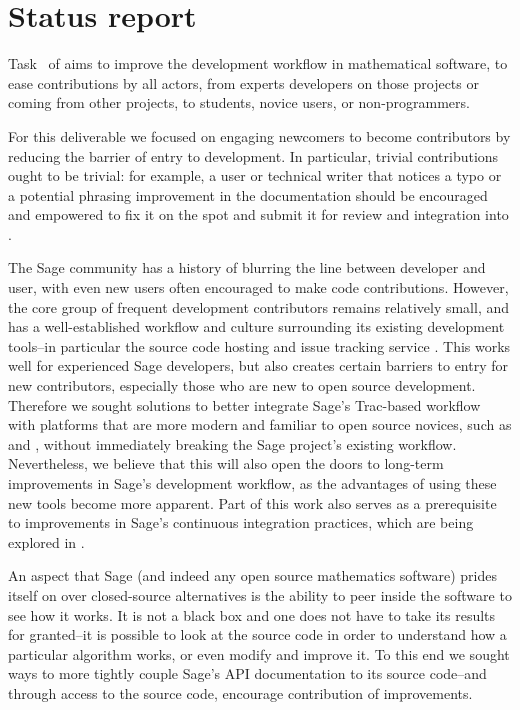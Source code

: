\hypertarget{status-report}{%
\section{Status report}\label{status-report}}

Task~ of
 aims to improve the development workflow in
mathematical software, to ease contributions by all actors, from experts
developers on those projects or coming from other projects, to students, novice
users, or non-programmers.

For this deliverable we focused on engaging newcomers to become contributors by
reducing the barrier of entry to \Sage development. In particular, trivial
contributions ought to be trivial: for example, a user or technical writer that
notices a typo or a potential phrasing improvement in the documentation should
be encouraged and empowered to fix it on the spot and submit it for review and
integration into \Sage.

The Sage community has a history of blurring the line between developer and
user, with even new users often encouraged to make code contributions.
However, the core group of frequent development contributors remains relatively
small, and has a well-established workflow and culture surrounding its existing
development tools--in particular the source code hosting and issue tracking
service \Trac.  This works well for experienced Sage developers, but also
creates certain barriers to entry for new contributors, especially those who
are new to open source development.  Therefore we sought solutions to better
integrate Sage's Trac-based workflow with platforms that are more modern and
familiar to open source novices, such as \GitHub and \GitLab, without
immediately breaking the Sage project's existing workflow.
%
%
Nevertheless, we believe that this will also open the doors to long-term
improvements in Sage's development workflow, as the advantages of using these
new tools become more apparent.  Part of this work also serves as a
prerequisite to improvements in Sage's continuous integration practices, which
are being explored in
.

An aspect that Sage (and indeed any open source mathematics software) prides
itself on over closed-source alternatives is the ability to peer inside the
software to see how it works.  It is not a black box and one does not have to
take its results for granted--it is possible to look at the source code in
order to understand how a particular algorithm works, or even modify and
improve it.  To this end we sought ways to more tightly couple Sage's API
documentation to its source code--and through access to the source code,
encourage contribution of improvements.


